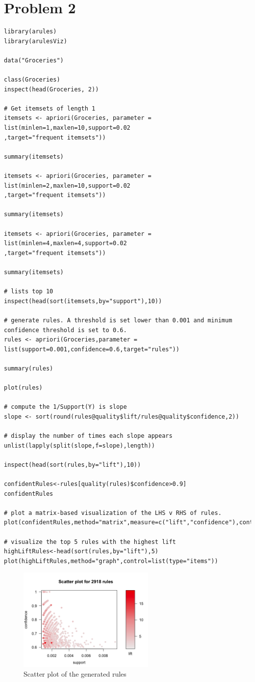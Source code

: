 \documentclass{article}
\begin{document}
\section{Problem 2}
\begin{lstlisting}
library(arules)
library(arulesViz)

data("Groceries")

class(Groceries)
inspect(head(Groceries, 2))

# Get itemsets of length 1
itemsets <- apriori(Groceries, parameter = list(minlen=1,maxlen=10,support=0.02
,target="frequent itemsets"))

summary(itemsets)

itemsets <- apriori(Groceries, parameter = list(minlen=2,maxlen=10,support=0.02
,target="frequent itemsets"))

summary(itemsets)

itemsets <- apriori(Groceries, parameter = list(minlen=4,maxlen=4,support=0.02
,target="frequent itemsets"))

summary(itemsets)

# lists top 10
inspect(head(sort(itemsets,by="support"),10))

# generate rules. A threshold is set lower than 0.001 and minimum confidence threshold is set to 0.6.
rules <- apriori(Groceries,parameter = list(support=0.001,confidence=0.6,target="rules"))

summary(rules)

plot(rules)       

# compute the 1/Support(Y) is slope
slope <- sort(round(rules@quality$lift/rules@quality$confidence,2))

# display the number of times each slope appears
unlist(lapply(split(slope,f=slope),length))

inspect(head(sort(rules,by="lift"),10))

confidentRules<-rules[quality(rules)$confidence>0.9]
confidentRules

# plot a matrix-based visualization of the LHS v RHS of rules.
plot(confidentRules,method="matrix",measure=c("lift","confidence"),control=list(reorder="none"))

# visualize the top 5 rules with the highest lift
highLiftRules<-head(sort(rules,by="lift"),5)
plot(highLiftRules,method="graph",control=list(type="items"))
\end{lstlisting}

\begin{figure}[H]
  \centering
  \caption{Scatter plot of the generated rules}
  \includegraphics[width=0.6\textwidth]{Fig1}
\end{figure}
\end{document}
